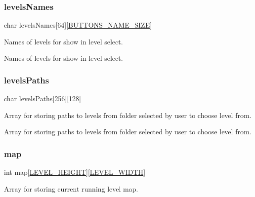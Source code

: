 \mbox{\label{group___library_merger_gae5cb82a78ca4ac2c20f9d071e7124f38}} 
\subsubsection{\texorpdfstring{levels\+Names}{levelsNames}}
{\footnotesize\ttfamily char levels\+Names\mbox{[}64\mbox{]}\mbox{[}\hyperlink{group___button_ga5a86b4b0ec8a21993f74ae423ec74538}{B\+U\+T\+T\+O\+N\+S\+\_\+\+N\+A\+M\+E\+\_\+\+S\+I\+ZE}\mbox{]}}



Names of levels for show in level select. 

Names of levels for show in level select. \mbox{\label{group___library_merger_ga5a00f62db43aff74971290ceba5fa7df}} 
\subsubsection{\texorpdfstring{levels\+Paths}{levelsPaths}}
{\footnotesize\ttfamily char levels\+Paths\mbox{[}256\mbox{]}\mbox{[}128\mbox{]}}



Array for storing paths to levels from folder selected by user to choose level from. 

Array for storing paths to levels from folder selected by user to choose level from. \mbox{\label{group___library_merger_gaf3cf0ba525aea0327b3c3512df21094a}} 
\subsubsection{\texorpdfstring{map}{map}}
{\footnotesize\ttfamily int map\mbox{[}\hyperlink{group___library_merger_ga16621561d55e77faa59fbfdae692916f}{L\+E\+V\+E\+L\+\_\+\+H\+E\+I\+G\+HT}\mbox{]}\mbox{[}\hyperlink{group___library_merger_ga219cc98394ab36a78470c0627c4f8464}{L\+E\+V\+E\+L\+\_\+\+W\+I\+D\+TH}\mbox{]}}



Array for storing current running level map. 

